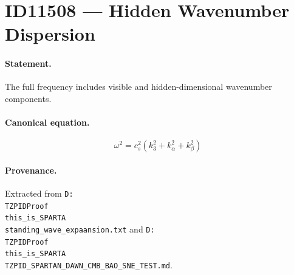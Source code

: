 \section*{ID11508 --- Hidden Wavenumber Dispersion}

\paragraph{Statement.}
The full frequency includes visible and hidden-dimensional wavenumber components.

\paragraph{Canonical equation.}
\[
\omega^2=c_s^2\left(k_3^2+k_\alpha^2+k_\beta^2\right)
\]

\paragraph{Provenance.}
Extracted from \texttt{D:\\TZPIDProof\\this\_is\_SPARTA\\standing\_wave\_expaansion.txt} and \texttt{D:\\TZPIDProof\\this\_is\_SPARTA\\TZPID\_SPARTAN\_DAWN\_CMB\_BAO\_SNE\_TEST.md}.
